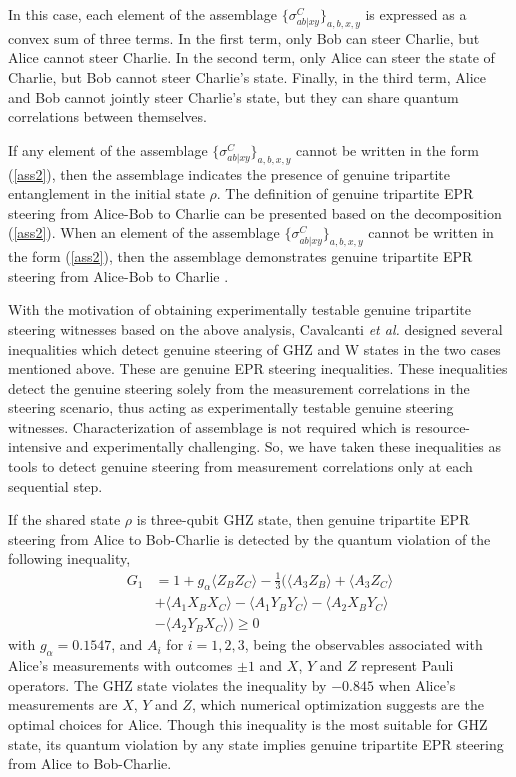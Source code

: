 \documentclass[pra,a4paper,aps,twocolumn,showpacs,superscriptaddress,groupedaddress]{revtex4}
\begin{document}
 In this case, each element of the  assemblage $\{\sigma_{ab|xy}^{C}\}_{a,b,x,y}$  is expressed as a convex sum of three terms. In the first term, only Bob can steer Charlie, but Alice cannot steer Charlie. In the second term, only Alice can steer the state of Charlie, but Bob cannot steer Charlie's state. Finally, in the third term, Alice and Bob cannot jointly steer Charlie's state, but they can share quantum correlations between themselves. 

If any element of the assemblage $\{\sigma_{ab|xy}^{C}\}_{a,b,x,y}$ cannot be written in the form (\ref{ass2}), then the assemblage indicates  the presence of genuine tripartite entanglement in the initial state $\rho$.  The definition of genuine tripartite EPR steering from Alice-Bob to Charlie can be presented based on the decomposition (\ref{ass2}). When an element  of the assemblage $\{\sigma_{ab|xy}^{C}\}_{a,b,x,y}$ cannot be written in the form (\ref{ass2}), then the assemblage demonstrates genuine  tripartite EPR steering from Alice-Bob to Charlie \cite{Daniel,stm2,stm3,stm4}. 




With the motivation of obtaining experimentally testable genuine tripartite steering witnesses based on the above analysis, Cavalcanti \textit{et al.} \cite{Daniel} designed several inequalities  which detect genuine steering of GHZ and W states in the two cases mentioned above. These  are  genuine EPR steering inequalities. These inequalities detect the genuine steering solely from the measurement correlations in the steering scenario, thus acting as experimentally testable genuine steering witnesses. Characterization of assemblage is not required which is resource-intensive and experimentally challenging. So, we have taken these inequalities as tools to detect genuine steering from measurement correlations only at each sequential step. 

If the shared state $\rho$ is three-qubit GHZ state, then genuine tripartite EPR steering from Alice to Bob-Charlie is detected by the quantum violation of the following inequality,
\begin{align}
G_1 &= 1 + g_{\alpha} \langle Z_BZ_C\rangle - \frac{1}{3} ( \langle A_3Z_B \rangle + \langle A_3Z_C \rangle  \nonumber \\
& + \langle A_1X_BX_C\rangle - \langle A_1Y_BY_C\rangle - \langle A_2X_BY_C\rangle \nonumber \\
& - \langle A_2Y_BX_C\rangle )\geq 0
\label{GHZ1}
\end{align}
with $g_{\alpha}=0.1547$, and  $A_i$ for $i=1, 2, 3$, being the observables associated with Alice's measurements with outcomes $\pm 1$ and $X$, $Y$ and $Z$ represent Pauli operators. The GHZ state violates the inequality by $-0.845$ when
Alice's measurements are $X$, $Y$ and $Z$, which numerical optimization suggests are the optimal choices for Alice. Though this inequality is the most suitable for GHZ state, its quantum violation by any state implies  genuine tripartite EPR steering from Alice to Bob-Charlie.
\end{document}

